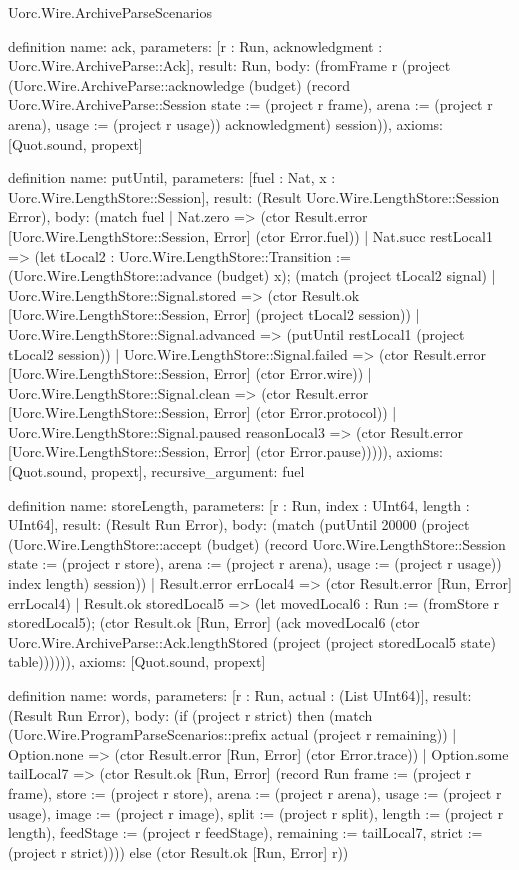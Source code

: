 \begin{lexlean}{Uorc.Wire.ArchiveParseScenarios}
\begin{semanticmodule}
definition{
  name: ack,
  parameters: [r : Run, acknowledgment : Uorc.Wire.ArchiveParse::Ack],
  result: Run,
  body: (fromFrame r (project (Uorc.Wire.ArchiveParse::acknowledge (budget) (record Uorc.Wire.ArchiveParse::Session {state := (project r frame), arena := (project r arena), usage := (project r usage)}) acknowledgment) session)),
  axioms: [Quot.sound, propext]
}

definition{
  name: putUntil,
  parameters: [fuel : Nat, x : Uorc.Wire.LengthStore::Session],
  result: (Result Uorc.Wire.LengthStore::Session Error),
  body: (match fuel
    | Nat.zero => (ctor Result.error [Uorc.Wire.LengthStore::Session, Error] (ctor Error.fuel))
    | Nat.succ restLocal1 => (let tLocal2 : Uorc.Wire.LengthStore::Transition := (Uorc.Wire.LengthStore::advance (budget) x); (match (project tLocal2 signal)
      | Uorc.Wire.LengthStore::Signal.stored => (ctor Result.ok [Uorc.Wire.LengthStore::Session, Error] (project tLocal2 session))
      | Uorc.Wire.LengthStore::Signal.advanced => (putUntil restLocal1 (project tLocal2 session))
      | Uorc.Wire.LengthStore::Signal.failed => (ctor Result.error [Uorc.Wire.LengthStore::Session, Error] (ctor Error.wire))
      | Uorc.Wire.LengthStore::Signal.clean => (ctor Result.error [Uorc.Wire.LengthStore::Session, Error] (ctor Error.protocol))
      | Uorc.Wire.LengthStore::Signal.paused reasonLocal3 => (ctor Result.error [Uorc.Wire.LengthStore::Session, Error] (ctor Error.pause))))),
  axioms: [Quot.sound, propext],
  recursive_argument: fuel
}

definition{
  name: storeLength,
  parameters: [r : Run, index : UInt64, length : UInt64],
  result: (Result Run Error),
  body: (match (putUntil 20000 (project (Uorc.Wire.LengthStore::accept (budget) (record Uorc.Wire.LengthStore::Session {state := (project r store), arena := (project r arena), usage := (project r usage)}) index length) session))
    | Result.error errLocal4 => (ctor Result.error [Run, Error] errLocal4)
    | Result.ok storedLocal5 => (let movedLocal6 : Run := (fromStore r storedLocal5); (ctor Result.ok [Run, Error] (ack movedLocal6 (ctor Uorc.Wire.ArchiveParse::Ack.lengthStored (project (project storedLocal5 state) table)))))),
  axioms: [Quot.sound, propext]
}

definition{
  name: words,
  parameters: [r : Run, actual : (List UInt64)],
  result: (Result Run Error),
  body: (if (project r strict) then (match (Uorc.Wire.ProgramParseScenarios::prefix actual (project r remaining))
    | Option.none => (ctor Result.error [Run, Error] (ctor Error.trace))
    | Option.some tailLocal7 => (ctor Result.ok [Run, Error] (record Run {frame := (project r frame), store := (project r store), arena := (project r arena), usage := (project r usage), image := (project r image), split := (project r split), length := (project r length), feedStage := (project r feedStage), remaining := tailLocal7, strict := (project r strict)}))) else (ctor Result.ok [Run, Error] r))
}


\end{semanticmodule}
\end{lexlean}
